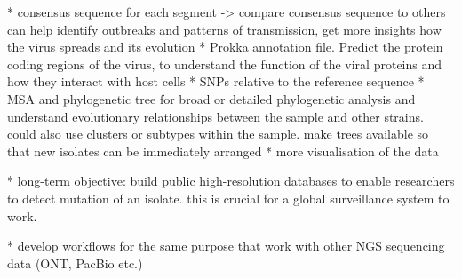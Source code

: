 * consensus sequence for each segment -> compare consensus sequence to others can help identify outbreaks and patterns of transmission, get more insights how the virus spreads and its evolution
* Prokka annotation file. Predict the protein coding regions of the virus, to understand the function of the viral proteins and how they interact with host cells
* SNPs relative to the reference sequence
* \ac{MSA} and phylogenetic tree for broad or detailed phylogenetic analysis and understand evolutionary relationships between the sample and other strains. could also use clusters or subtypes within the sample. make trees available so that new isolates can be immediately arranged
* more visualisation of the data

* long-term objective: build public high-resolution databases to enable researchers to detect mutation of an isolate. this is crucial for a global surveillance system to work.

* develop workflows for the same purpose that work with other NGS sequencing data (ONT, PacBio etc.)